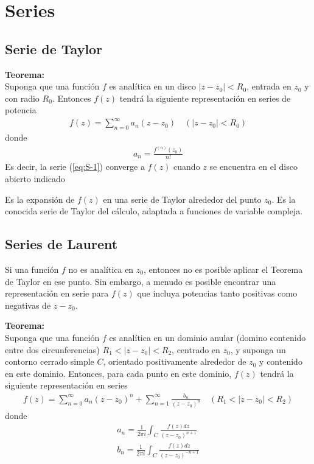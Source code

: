 \section{Series}

\subsection{Serie de Taylor}
\begin{mdframed}
    \textbf{Teorema:}\\
    Suponga que una función $f$ es analítica en un disco $|z - z_0| < R_0$, entrada en $z_0$ y con radio $R_0$. Entonces $f(z)$ tendrá la siguiente representación en series de potencia
    \begin{gather}
        \label{eq:S-1}f(z) = \sum_{n = 0}^{\infty} a_n(z - z_0) \quad (|z - z_0| < R_0)
    \end{gather}
    donde 
    \begin{gather}
        a_n = \frac{f^{(n)}(z_0)}{n!}
    \end{gather}
    Es decir, la serie (\ref*{eq:S-1}) converge a $f(z)$ cuando $z$ se encuentra en el disco abierto indicado
\end{mdframed}
Es la expansión de $f(z)$ en una serie de Taylor alrededor del punto $z_0$. Es la conocida serie de Taylor del cálculo, adaptada a funciones de variable compleja.

\subsection{Series de Laurent}

Si una función $f$ no es analítica en $z_0$, entonces no es posible aplicar el Teorema de Taylor en ese punto.  Sin embargo, a menudo es posible encontrar una representación en serie para $f(z)$ que incluya potencias tanto positivas como negativas de $z - z_0$.

\begin{mdframed}
    \textbf{Teorema:}\\
    Suponga que una función $f$ es analítica en un dominio anular (domino contenido entre dos circunferencias) $R_1 < |z - z_0| < R_2$, centrado en $z_0$, y suponga un contorno cerrado simple $C$, orientado positivamente alrededor de $z_0$ y contenido en este dominio. Entonces, para cada punto en este dominio, $f(z)$ tendrá la siguiente representación en series 
    \begin{gather}
        f(z) = \sum_{n = 0}^{\infty}a_n(z-z_0)^{n} + \sum_{n = 1}^{\infty} \frac{b_n}{(z-z_0)^{n}} \quad (R_1 < |z - z_0| < R_2)
    \end{gather}
    donde 
    \begin{gather}
        a_n = \frac{1}{2\pi i}\int_C \frac{f(z)dz}{(z-z_0)^{n+1}}\\
        b_n = \frac{1}{2\pi i}\int_C \frac{f(z)dz}{(z-z_0)^{-n+1}}
    \end{gather}
\end{mdframed}
